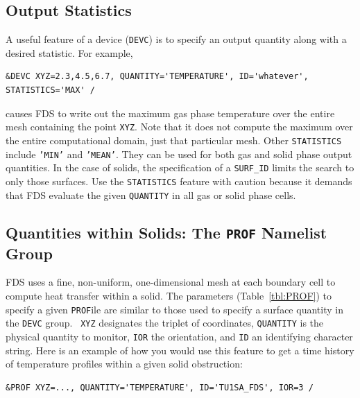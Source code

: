 \documentclass[11pt]{book}
\newcommand{\ct}{\tt\small}
\begin{document}
\subsection{Output Statistics}
\label{info:statistics}

A useful feature of a device ({\ct DEVC}) is to specify an output quantity along with a desired statistic. For example,

\footnotesize
\begin{verbatim}
&DEVC XYZ=2.3,4.5,6.7, QUANTITY='TEMPERATURE', ID='whatever', STATISTICS='MAX' /
\end{verbatim}
\normalsize

\noindent
causes FDS to write out the maximum gas phase temperature over the entire mesh containing the point {\ct XYZ}. Note that it
does not compute the maximum over the entire computational domain, just that particular mesh. Other {\ct STATISTICS} include
{\ct 'MIN'} and {\ct 'MEAN'}. They can be used for both gas and solid phase output quantities. In the case of solids, the
specification of a {\ct SURF\_ID} limits the search to only those surfaces. Use the {\ct STATISTICS} feature with caution because
it demands that FDS evaluate the given {\ct QUANTITY} in all gas or solid phase cells.




\subsection{Quantities within Solids: The \texorpdfstring{{\tt PROF}}{PROF} Namelist Group}%
\label{info:PROF} 

FDS uses a fine, non-uniform, one-dimensional mesh at each boundary
cell to compute heat transfer within a solid. The parameters
(Table~\ref{tbl:PROF}) to specify a given {\ct PROF}ile are similar to
those used to specify a surface quantity in the {\ct DEVC} group. {\ct
XYZ} designates the triplet of coordinates, {\ct QUANTITY} is the
physical quantity to monitor, {\ct IOR} the orientation,
and {\ct ID} an identifying character string. Here is an example of
how you would use this feature to get a time history of temperature
profiles within a given solid obstruction:

\footnotesize
\begin{verbatim}
&PROF XYZ=..., QUANTITY='TEMPERATURE', ID='TU1SA_FDS', IOR=3 /
\end{verbatim} \normalsize
\end{document}
